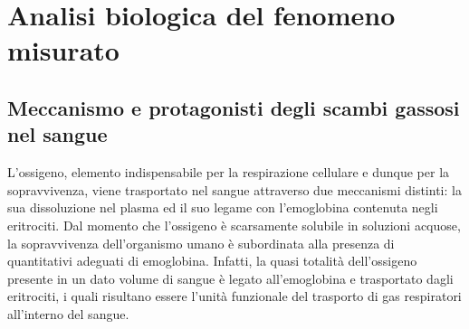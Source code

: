 \documentclass[a4paper, 12pt]{book}
\begin{document}
\section{Analisi biologica del fenomeno misurato}


\subsection{Meccanismo e protagonisti degli scambi gassosi nel sangue}

L'ossigeno, elemento indispensabile per la respirazione cellulare e dunque per la sopravvivenza, viene trasportato nel sangue attraverso due meccanismi distinti: la sua dissoluzione nel plasma ed il suo legame con l'emoglobina contenuta negli eritrociti.
Dal momento che l'ossigeno è scarsamente solubile in soluzioni acquose, la sopravvivenza dell'organismo umano è subordinata alla presenza di quantitativi adeguati di emoglobina.
Infatti, la quasi totalità dell'ossigeno presente in un dato volume di sangue è legato all'emoglobina e trasportato dagli eritrociti, i quali risultano essere l’unità funzionale del trasporto di gas respiratori all’interno del sangue.
\newline
\end{document}
